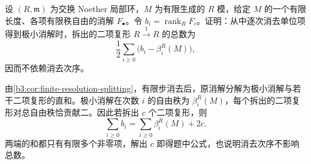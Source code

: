 \begin{exercise}\label{b3:ex:17-unit-cancellation}
	设 \((R,\mathfrak m)\) 为交换 Noether 局部环，\(M\) 为有限生成的 \(R\) 模，给定 \(M\) 的一个有限长度、各项有限秩自由的消解 \(F_\bullet\)。令 \(b_i=\operatorname{rank}_RF_i\)。证明：从中逐次消去单位项得到极小消解时，拆出的二项复形 \(R\xrightarrow{1}R\) 的总数为
	\[
		\dfrac{1}{2}\sum_{i\ge0}\bigl(b_i-\beta_i^R(M)\bigr),
	\]
	因而不依赖消去次序。
\end{exercise}
\begin{solution}
	由\cref{b3:cor:finite-resolution-splitting}，有限步消去后，原消解分解为极小消解与若干二项复形的直和。极小消解在次数 \(i\) 的自由秩为 \(\beta_i^R(M)\)，每个拆出的二项复形对总自由秩恰贡献二。因此若拆出 \(c\) 个二项复形，则
	\[
		\sum_{i\ge0}b_i=\sum_{i\ge0}\beta_i^R(M)+2c.
	\]
	两端的和都只有有限多个非零项，解出 \(c\) 即得题中公式，也说明消去次序不影响总数。
\end{solution}
